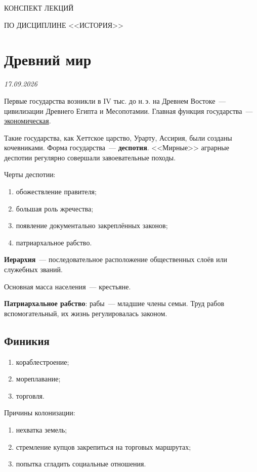\documentclass[a4paper, 12pt]{article}
\newcommand{\lecdate}[1]{\vspace{-4pt}\hfill{\small\textit{#1}}\par}
\begin{document}
\begin{center}
{\large КОНСПЕКТ ЛЕКЦИЙ}

ПО ДИСЦИПЛИНЕ <<ИСТОРИЯ>>

\tableofcontents
\label{contents}

\pagebreak
\end{center}
\vspace{10pt}

\section{Древний мир}
\lecdate{17.09.2026}

Первые государства возникли в IV тыс. до н.\,э. на Древнем Востоке~---
цивилизации Древнего Египта и Месопотамии. Главная функция государства~---
\underline{экономическая}.

Такие государства, как Хеттское царство, Урарту, Ассирия, были созданы
кочевниками. Форма государства~--- \textbf{деспотия}. <<Мирные>> аграрные
деспотии регулярно совершали завоевательные походы.

Черты деспотии:
\begin{enumerate}[noitemsep]
  \item обожествление правителя;
  \item большая роль жречества;
  \item появление документально закреплённых законов;
  \item патриархальное рабство.
\end{enumerate}

\textbf{Иерархия}~--- последовательное расположение общественных слоёв или
служебных званий.

Основная масса населения~--- крестьяне.

\textbf{Патриархальное рабство}: рабы~--- младшие члены семьи. Труд рабов
вспомогательный, их жизнь регулировалась законом.

\subsection{Финикия}
\begin{enumerate}[noitemsep]
  \item кораблестроение;
  \item мореплавание;
  \item торговля.
\end{enumerate}

Причины колонизации:
\begin{enumerate}[noitemsep]
  \item нехватка земель;
  \item стремление купцов закрепиться на торговых маршрутах;
  \item попытка сгладить социальные отношения.
\end{enumerate}
\end{document}
